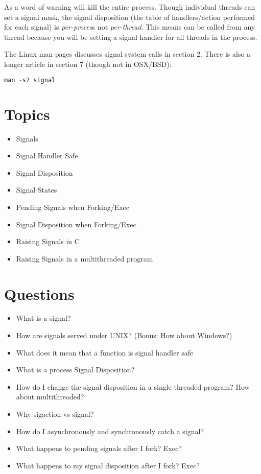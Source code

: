As a word of warning  will kill the entire process. Though individual threads can set a signal mask, the signal disposition (the table of handlers/action performed for each signal) is \emph{per-proces}s not \emph{per-thread}. This means  can be called from any thread because you will be setting a signal handler for all threads in the process.

The Linux man pages discusses signal system calls in section 2. There is also a longer article in section 7 (though not in OSX/BSD):

\begin{lstlisting}[language=C]
man -s7 signal
\end{lstlisting}

\section{Topics}

\begin{itemize}
\tightlist
\item
  Signals
\item
  Signal Handler Safe
\item
  Signal Disposition
\item
  Signal States
\item
  Pending Signals when Forking/Exec
\item
  Signal Disposition when Forking/Exec
\item
  Raising Signals in C
\item
  Raising Signals in a multithreaded program
\end{itemize}

\section{Questions}

\begin{itemize}
\tightlist
\item
  What is a signal?
\item
  How are signals served under UNIX? (Bonus: How about Windows?)
\item
  What does it mean that a function is signal handler safe
\item
  What is a process Signal Disposition?
\item
  How do I change the signal disposition in a single threaded program?
  How about multithreaded?
\item
  Why sigaction vs signal?
\item
  How do I asynchronously and synchronously catch a signal?
\item
  What happens to pending signals after I fork? Exec?
\item
  What happens to my signal disposition after I fork? Exec?
\end{itemize}



